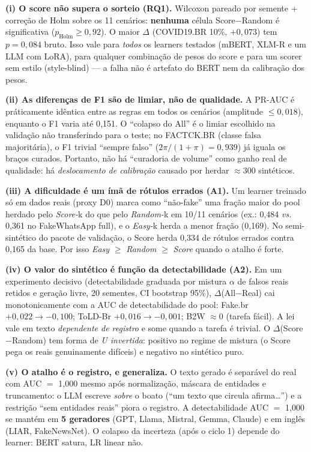 \documentclass[conference]{IEEEtran}
\begin{document}
\textbf{(i) O score n\~ao supera o sorteio (RQ1).} Wilcoxon pareado por semente + corre\c{c}\~ao de Holm sobre os 11 cen\'arios: \textbf{nenhuma} c\'elula Score$-$Random \'e significativa ($p_{\mathrm{Holm}}\ge 0{,}92$). O maior $\Delta$ (COVID19.BR 10\%, $+0{,}073$) tem $p{=}0{,}084$ bruto. Isso vale para \emph{todos} os learners testados (mBERT, XLM-R e um LLM com LoRA), para qualquer combina\c{c}\~ao de pesos do score e para um scorer sem estilo (style-blind) --- a falha n\~ao \'e artefato do BERT nem da calibra\c{c}\~ao dos pesos.

\textbf{(ii) As diferen\c{c}as de F1 s\~ao de limiar, n\~ao de qualidade.} A PR-AUC \'e pr\'aticamente id\^entica entre as regras em todos os cen\'arios (amplitude $\le 0{,}018$), enquanto o F1 varia at\'e 0{,}151. O ``colapso do All'' \'e o limiar escolhido na valida\c{c}\~ao n\~ao transferindo para o teste; no FACTCK.BR (classe falsa majorit\'aria), o F1 trivial ``sempre falso'' ($2\pi/(1{+}\pi){=}0{,}939$) j\'a iguala os bra\c{c}os curados. Portanto, n\~ao h\'a ``curadoria de volume'' como ganho real de qualidade: h\'a \emph{deslocamento de calibra\c{c}\~ao} causado por herdar $\approx$300 sint\'eticos.

\textbf{(iii) A dificuldade \'e um \'im\~a de r\'otulos errados (A1).} Um learner treinado s\'o em dados reais (proxy D0) marca como ``n\~ao-fake'' uma fra\c{c}\~ao maior do pool herdado pelo \emph{Score-}k do que pelo \emph{Random-}k em 10/11 cen\'arios (ex.: 0{,}484 \emph{vs.} 0{,}361 no FakeWhatsApp full), e o \emph{Easy-}k herda a menor fra\c{c}\~ao (0{,}169). No semi-sint\'etico do pacote de valida\c{c}\~ao, o Score herda 0{,}334 de r\'otulos errados contra 0{,}165 da base. Por isso \emph{Easy} $\ge$ \emph{Random} $\ge$ \emph{Score} quando o atalho \'e forte.

\textbf{(iv) O valor do sint\'etico \'e fun\c{c}\~ao da detectabilidade (A2).} Em um experimento decisivo (detectabilidade graduada por mistura $\alpha$ de falsos reais retidos e gera\c{c}\~ao livre, 20 sementes, CI bootstrap 95\%), $\Delta$(All$-$Real) cai monotonicamente com a AUC de detectabilidade do pool: Fake.br $+0{,}022\to-0{,}100$; ToLD-Br $+0{,}016\to-0{,}001$; B2W $\approx0$ (tarefa f\'acil). A lei vale em texto \emph{dependente de registro} e some quando a tarefa \'e trivial. O $\Delta$(Score$-$Random) tem forma de \emph{U invertida}: positivo no regime de mistura (o Score pega os reais genuinamente dif\'iceis) e negativo no sint\'etico puro.

\textbf{(v) O atalho \'e o registro, e generaliza.} O texto gerado \'e separ\'avel do real com AUC $=$ 1{,}000 mesmo ap\'os normaliza\c{c}\~ao, m\'ascara de entidades e truncamento: o LLM escreve \emph{sobre} o boato (``um texto que circula afirma\ldots'') e a restri\c{c}\~ao ``sem entidades reais'' piora o registro. A detectabilidade AUC $=$ 1{,}000 se mant\'em em \textbf{5 geradores} (GPT, Llama, Mistral, Gemma, Claude) e em ingl\^es (LIAR, FakeNewsNet). O colapso da incerteza (ap\'os o ciclo 1) depende do learner: BERT satura, LR linear n\~ao.
\end{document}
